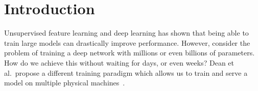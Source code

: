 %
%
%

\chapter[Introduction]{Introduction}
\label{chapter:introduction}


Unsupervised feature learning and deep learning has shown that being able to train large models can drastically improve performance. However, consider the problem of training a deep network with millions or even billions of parameters. How do we achieve this without waiting for days, or even weeks? Dean et al.~propose a different training paradigm which allows us to train and serve a model on multiple physical machines~\cite{dean2012large}.
